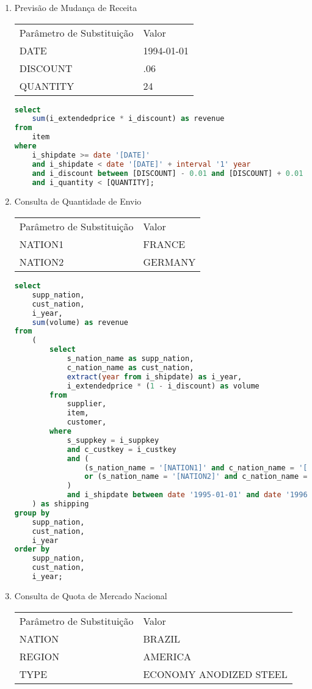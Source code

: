 \begin{enumerate}
\item Previsão de Mudança de Receita

\begin{tabular}{ll}
	Parâmetro de Substituição & Valor\\
	DATE & 1994-01-01\\
	DISCOUNT & .06\\
	QUANTITY & 24\\
\end{tabular}

	\begin{lstlisting}[language=SQL]
select
	sum(i_extendedprice * i_discount) as revenue
from
	item
where
	i_shipdate >= date '[DATE]'
	and i_shipdate < date '[DATE]' + interval '1' year
	and i_discount between [DISCOUNT] - 0.01 and [DISCOUNT] + 0.01
	and i_quantity < [QUANTITY];
	\end{lstlisting}
	
\item Consulta de Quantidade de Envio

\begin{tabular}{ll}
	Parâmetro de Substituição & Valor\\
	NATION1 & FRANCE\\
	NATION2 & GERMANY\\
\end{tabular}

	\begin{lstlisting}[language=SQL]
select
	supp_nation,
	cust_nation,
	i_year,
	sum(volume) as revenue
from
	(
		select
			s_nation_name as supp_nation,
			c_nation_name as cust_nation,
			extract(year from i_shipdate) as i_year,
			i_extendedprice * (1 - i_discount) as volume
		from
			supplier,
			item,
			customer,
		where
			s_suppkey = i_suppkey
			and c_custkey = i_custkey
			and (
				(s_nation_name = '[NATION1]' and c_nation_name = '[NATION2]')
				or (s_nation_name = '[NATION2]' and c_nation_name = '[NATION1]')
			)
			and i_shipdate between date '1995-01-01' and date '1996-12-31'
	) as shipping
group by
	supp_nation,
	cust_nation,
	i_year
order by
	supp_nation,
	cust_nation,
	i_year;
\end{lstlisting}

\item Consulta de Quota de Mercado Nacional

\begin{tabular}{ll}
	Parâmetro de Substituição & Valor\\
	NATION & BRAZIL\\
	REGION & AMERICA\\
	TYPE &  ECONOMY ANODIZED STEEL\\
\end{tabular}


\end{enumerate}

